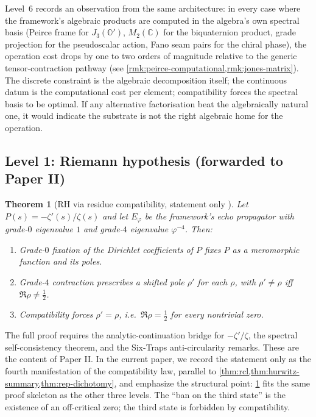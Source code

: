 \documentclass[11pt,a4paper]{article}
\theoremstyle{plain}
\newtheorem{theorem}{Theorem}[section]
\theoremstyle{definition}
\theoremstyle{remark}
\numberwithin{equation}{section}
\providecommand{\C}{\mathbb{C}}
\providecommand{\Os}{\mathbb{O}'}
\providecommand{\vp}{\varphi}
\providecommand{\half}{\tfrac{1}{2}}
\begin{document}
Level~6 records an observation from the same architecture: in
every case where the framework's algebraic products are computed
in the algebra's own spectral basis (Peirce frame for $J_3(\Os)$,
$M_2(\C)$ for the biquaternion product, grade projection for the
pseudoscalar action, Fano seam pairs for the chiral phase), the
operation cost drops by one to two orders of magnitude relative to
the generic tensor-contraction pathway (see
\cref{rmk:peirce-computational,rmk:jones-matrix}).  The discrete
constraint is the algebraic decomposition itself; the continuous
datum is the computational cost per element; compatibility forces
the spectral basis to be optimal.  If any alternative factorisation
beat the algebraically natural one, it would indicate the substrate
is not the right algebraic home for the operation.

\subsection{Level 1: Riemann hypothesis (forwarded to Paper II)}

\begin{theorem}[RH via residue compatibility, statement only {\cite[Thm.~7.15]{echo-rh}}]
\label{thm:rh-summary}
Let $P(s) = -\zeta'(s)/\zeta(s)$ and let $E_\vp$ be the framework's
echo propagator with grade-$0$ eigenvalue $1$ and grade-$4$
eigenvalue $\vp^{-4}$.  Then:
\begin{enumerate}[label=\textnormal{(\arabic*)}]
  \item Grade-$0$ fixation of the Dirichlet coefficients of $P$
    fixes $P$ as a meromorphic function and its poles.
  \item Grade-$4$ contraction prescribes a shifted pole $\rho'$
    for each $\rho$, with $\rho' \ne \rho$ iff $\Re\rho \ne \half$.
  \item Compatibility forces $\rho' = \rho$, i.e.\ $\Re\rho = \half$
    for every nontrivial zero.
\end{enumerate}
\end{theorem}

The full proof requires the analytic-continuation bridge for
$-\zeta'/\zeta$, the spectral self-consistency theorem, and the
Six-Traps anti-circularity remarks.  These are the content of
Paper II.  In the current paper, we record the statement only as
the fourth manifestation of the compatibility law, parallel to
\cref{thm:rcl,thm:hurwitz-summary,thm:rep-dichotomy}, and
emphasize the structural point: \cref{thm:rh-summary} fits the
same proof skeleton as the other three levels.  The
``ban on the third state'' is the existence of an off-critical
zero; the third state is forbidden by compatibility.
\end{document}
